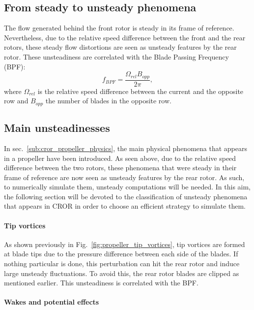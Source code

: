 
\subsection{From steady to unsteady phenomena}
\label{sub:cror_from_steady_to_unsteady_phenomena}

The flow generated behind the front rotor
is steady in its frame of reference. Nevertheless,
due to the relative speed difference between the
front and the rear rotors, these steady flow distortions are
seen as unsteady features by the rear rotor. 
These unsteadiness are correlated with the Blade Passing Frequency (BPF):
\begin{equation}
	f_{BPF} = \frac{\Omega_{rel} B_{opp}}{2 \pi},
\end{equation}
where $\Omega_{rel}$ is the relative speed difference between
the current and the opposite row
and $B_{opp}$ the number of blades in the opposite row.

\subsection{Main unsteadinesses}
\label{sub:cror_main_unsteadinesses}

In sec.~\ref{sub:cror_propeller_physics}, the main physical phenomena
that appears in a propeller have been introduced. As seen above, due to
the relative speed difference between the two rotors, these phenomena
that were steady in their frame of reference are now seen as unsteady features
by the rear rotor. As such, to numerically simulate them, unsteady computations
will be needed. In this aim, the following section will be devoted to the classification
of unsteady phenomena that appears in CROR in 
order to choose an efficient strategy to simulate them.

\paragraph{Tip vortices}

As shown previously in Fig.~\ref{fig:propeller_tip_vortices}, tip vortices are formed
at blade tips due to the pressure difference between each side of the blades.
If nothing particular is done, this perturbation can
hit the rear rotor and induce large unsteady fluctuations. To avoid this,
the rear rotor blades are clipped as mentioned earlier. 
This unsteadiness is correlated with the BPF.

\paragraph{Wakes and potential effects}


